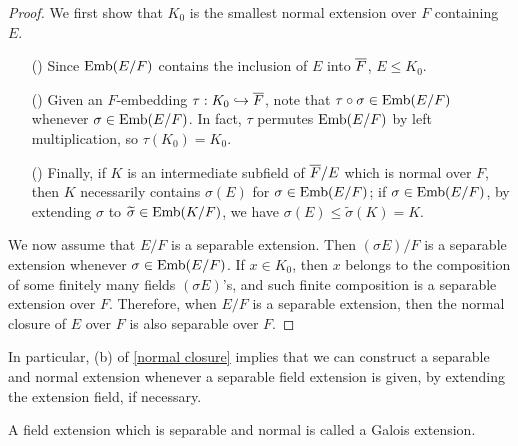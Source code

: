 \begin{proof}
    We first show that $K_0$ is the smallest normal extension over $F$ containing $E$.
    \begin{enumerate}
        \item[(\romannumeral 1)]
        {
            Since ${\textrm{Emb}({E/F})}$ contains the inclusion of $E$ into $\overline{F}$, $E\leq K_0$.        
        }
        \item[(\romannumeral 2)]
        {
            Given an $F$-embedding $\tau: K_0\hookrightarrow\overline{F}$, note that $\tau\circ\sigma\in{\textrm{Emb}({E/F})}$ whenever $\sigma\in{\textrm{Emb}({E/F})}$.
            In fact, $\tau$ permutes ${\textrm{Emb}({E/F})}$ by left multiplication, so $\tau(K_0)=K_0$.
        }
        \item[(\romannumeral 3)]
        {
            Finally, if $K$ is an intermediate subfield of $\overline{F}/E$ which is normal over $F$, then $K$ necessarily contains $\sigma(E)$ for $\sigma\in{\textrm{Emb}({E/F})}$; if $\sigma\in{\textrm{Emb}({E/F})}$, by extending $\sigma$ to $\widetilde{\sigma}\in{\textrm{Emb}({K/F})}$, we have $\sigma(E)\leq\widetilde{\sigma}(K)=K$.
        }
    \end{enumerate}
    
    We now assume that $E/F$ is a separable extension.
    Then $(\sigma E)/F$ is a separable extension whenever $\sigma\in{\textrm{Emb}({E/F})}$.
    If $x\in K_0$, then $x$ belongs to the composition of some finitely many fields $(\sigma E)$'s, and such finite composition is a separable extension over $F$.
    Therefore, when $E/F$ is a separable extension, then the normal closure of $E$ over $F$ is also separable over $F$.
\end{proof}

In particular, (b) of \cref{normal closure} implies that we can construct a separable and normal extension whenever a separable field extension is given, by extending the extension field, if necessary.
\begin{defi}
    A field extension which is separable and normal is called a Galois extension.
\end{defi}